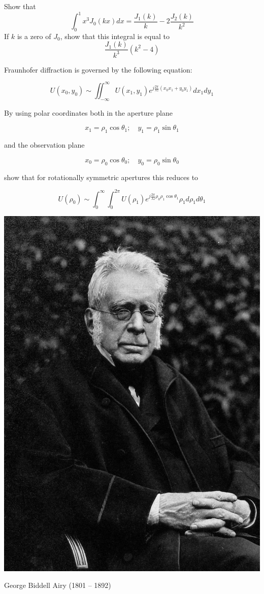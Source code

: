 \begin{exer}
Show that
$$\int_0^1 x^3 J_0(k x) dx =  \frac{J_1(k)}{k} - 2 \frac{J_2(k)}{k^2}$$
If $k$ is a zero of $J_0$, show that this integral is equal to
$$\frac{J_1(k)}{k^3}\left(k^2-4\right)$$
\end{exer}

\begin{exer}
Fraunhofer diffraction is governed by the following equation:

$$U(x_0, y_0) \sim \iint_{-\infty}^{\infty} U(x_1, y_1) e ^{j \frac{2\pi}{\lambda z} (x_0 x_1 + y_0 y_1)} dx_1 dy_1  $$

By using polar coordinates both in the aperture plane

$$x_1 = \rho_1 \cos \theta_1; \quad y_1 = \rho_1 \sin \theta_1$$

and the observation plane

$$x_0 = \rho_0 \cos \theta_0; \quad y_0 = \rho_0 \sin \theta_0$$

show that for rotationally symmetric apertures this reduces to

$$U(\rho_0) \sim  \int_0^{\infty} \int_0^{2 \pi} U(\rho_1)  e ^{j \frac{2\pi}{\lambda z} \rho_0 \rho_1 \cos \theta_1} \rho_1 d\rho_1 d\theta_1  $$

\begin{marginfigure}[-5cm]
  \includegraphics{bessel/figures/g_airy}
  \caption{George Biddell Airy (1801 – 1892)}
\end{marginfigure}


\end{exer}
